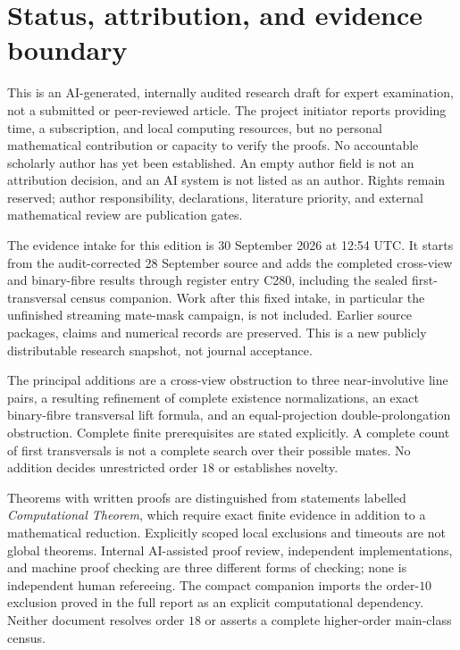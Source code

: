 \section*{Status, attribution, and evidence boundary}
This is an AI-generated, internally audited research draft for expert
examination, not a submitted or peer-reviewed article. The project initiator
reports providing time, a subscription, and local computing resources, but
no personal mathematical contribution or capacity to verify the proofs.
No accountable scholarly author has yet been established. An empty author
field is not an attribution decision, and an AI system is not listed as an
author. Rights remain reserved; author responsibility, declarations,
literature priority, and external mathematical review are publication gates.

The evidence intake for this edition is 30 September 2026 at 12:54 UTC.
It starts from the audit-corrected 28 September source and adds the
completed cross-view and binary-fibre results through register entry C280,
including the sealed first-transversal census companion. Work after this
fixed intake, in particular the unfinished streaming mate-mask campaign,
is not included. Earlier source packages, claims and numerical records
are preserved. This is a new publicly distributable research snapshot,
not journal acceptance.

The principal additions are a cross-view obstruction to three
near-involutive line pairs, a resulting refinement of complete existence
normalizations, an exact binary-fibre transversal lift formula, and an
equal-projection double-prolongation obstruction. Complete finite
prerequisites are stated explicitly. A complete count of first
transversals is not a complete search over their possible mates.
No addition decides unrestricted order $18$ or establishes novelty.

Theorems with written proofs are distinguished from statements labelled
\emph{Computational Theorem}, which require exact finite evidence in
addition to a mathematical reduction. Explicitly scoped local exclusions
and timeouts are not global theorems. Internal AI-assisted proof review,
independent implementations, and machine proof checking are three different
forms of checking; none is independent human refereeing. The compact
companion imports the order-$10$ exclusion proved in the full report as an
explicit computational dependency. Neither document resolves order $18$ or
asserts a complete higher-order main-class census.
